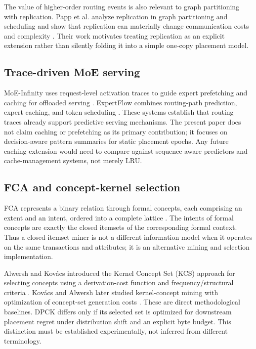 \documentclass[a4paper,preprint,review,12pt,authoryear]{elsarticle}
\begin{document}
The value of higher-order routing events is also relevant to graph partitioning with replication. Papp et al. analyze replication in graph partitioning and scheduling and show that replication can materially change communication costs and complexity \citep{papp2026replication}. Their work motivates treating replication as an explicit extension rather than silently folding it into a simple one-copy placement model.

\subsection{Trace-driven MoE serving}

MoE-Infinity uses request-level activation traces to guide expert prefetching and caching for offloaded serving \citep{xue2024moeinfinity}. ExpertFlow combines routing-path prediction, expert caching, and token scheduling \citep{he2026expertflow}. These systems establish that routing traces already support predictive serving mechanisms. The present paper does not claim caching or prefetching as its primary contribution; it focuses on decision-aware pattern summaries for static placement epochs. Any future caching extension would need to compare against sequence-aware predictors and cache-management systems, not merely LRU.

\subsection{FCA and concept-kernel selection}

FCA represents a binary relation through formal concepts, each comprising an extent and an intent, ordered into a complete lattice \citep{ganter1999fca}. The intents of formal concepts are exactly the closed itemsets of the corresponding formal context. Thus a closed-itemset miner is not a different information model when it operates on the same transactions and attributes; it is an alternative mining and selection implementation.

Alwersh and Kov\'acs introduced the Kernel Concept Set (KCS) approach for selecting concepts using a derivation-cost function and frequency/structural criteria \citep{alwersh2024kcs}. Kov\'acs and Alwersh later studied kernel-concept mining with optimization of concept-set generation costs \citep{kovacs2026kernel}. These are direct methodological baselines. DPCK differs only if its selected set is optimized for downstream placement regret under distribution shift and an explicit byte budget. This distinction must be established experimentally, not inferred from different terminology.
\end{document}
